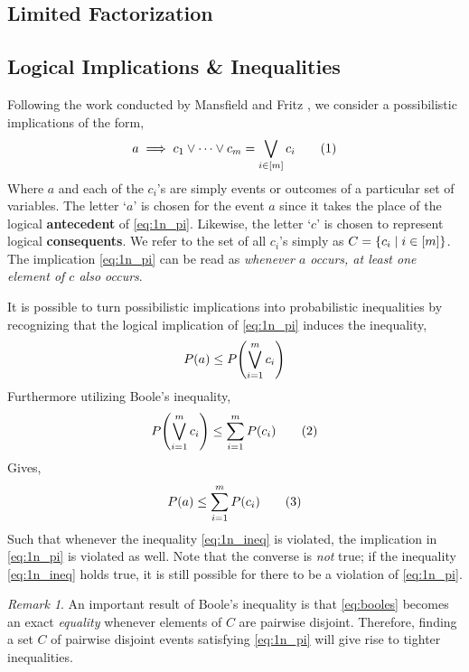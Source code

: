 \documentclass[aps, 10pt, english, twoside, pra, nofootinbib, longbibliography]{revtex4-1}
\theoremstyle{plain}
\theoremstyle{definition}
\theoremstyle{remark}
\newtheorem{remark}[theorem]{Remark}
\newcommand{\term}[1]{\textcolor{Mahogany}{\textbf{#1}}}
\begin{document}
    \subsection{Limited Factorization}

    \subsection{Logical Implications \& Inequalities}
    \label{sec:implication_inequalities}
    Following the work conducted by Mansfield and Fritz \cite{Mansfield_2012}, we consider a possibilistic implications of the form,
    \[ a \implies c_1 \lor \cdots \lor c_m = \bigvee_{i\in \bs{m}} c_i \eq \label{eq:1n_pi}\]
    Where $a$ and each of the $c_i$'s are simply events or outcomes of a particular set of variables. The letter `$a$' is chosen for the event $a$ since it takes the place of the logical \term{antecedent} of \cref{eq:1n_pi}. Likewise, the letter `$c$' is chosen to represent logical \term{consequents}. We refer to the set of all $c_i$'s simply as $C = \bc{c_i \mid i \in \bs{m}}$. The implication \cref{eq:1n_pi} can be read as \textit{whenever $a$ occurs, at least one element of $c$ also occurs}.

    It is possible to turn possibilistic implications into probabilistic inequalities by recognizing that the logical implication of \cref{eq:1n_pi} induces the inequality,
    \[ \prob[][a] \leq \prob[][\bigvee_{i=1}^{m} c_i] \]
    Furthermore utilizing Boole's inequality,
    \[ \prob[][\bigvee_{i=1}^{m} c_i] \leq \sum_{i=1}^{m} \prob[][c_i] \eq \label{eq:booles} \]
    Gives,
    \[ \prob[][a] \leq \sum_{i=1}^{m} \prob[][c_i] \eq \label{eq:1n_ineq} \]
    Such that whenever the inequality \cref{eq:1n_ineq} is violated, the implication in \cref{eq:1n_pi} is violated as well. Note that the converse is \textit{not} true; if the inequality \cref{eq:1n_ineq} holds true, it is still possible for there to be a violation of \cref{eq:1n_pi}.

    \begin{remark}
        An important result of Boole's inequality is that \cref{eq:booles} becomes an exact \textit{equality} whenever elements of $C$ are pairwise disjoint. Therefore, finding a set $C$ of pairwise disjoint events satisfying \cref{eq:1n_pi} will give rise to tighter inequalities.
    \end{remark}
\end{document}
